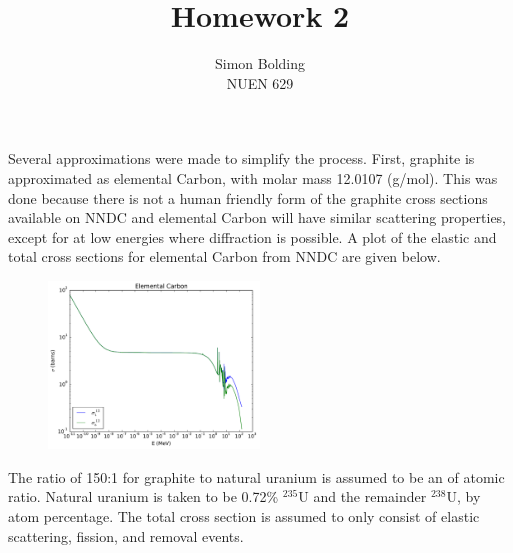 \documentclass[12pt]{article}
\newenvironment{solnum}[2][Solution]{\begin{trivlist}
\item[\hskip \labelsep {\bfseries #1}\hskip \labelsep {\bfseries #2:}]\hspace{0.3in}\newline\newline}{\end{trivlist}}
\begin{document}
 
 
\title{Homework 2}%
\author{Simon Bolding\\ %
NUEN 629} %
 
\maketitle

\clearpage



\begin{solnum}{1}
    
Several approximations were made to simplify the process.  First, graphite is
approximated as elemental Carbon, with molar mass 12.0107 (g/mol).  This was done because there is not a human
friendly form of the graphite cross sections available on NNDC and elemental Carbon
will have similar scattering properties, except for at low energies where diffraction is
possible.  A plot of the elastic and total cross sections for elemental Carbon from
NNDC are given below.
\begin{figure}[h!]
\centering
\includegraphics[width=0.5\textwidth]{carb_cx.pdf}
\end{figure}


The ratio of 150:1 for graphite to natural uranium is assumed to be an of
atomic ratio.  Natural uranium is
taken to be 0.72\% $^{235}$U and the remainder $^{238}$U, by atom percentage. 
The total cross section
is assumed to only consist of elastic scattering, fission, and removal events.


\end{solnum}
\end{document}
